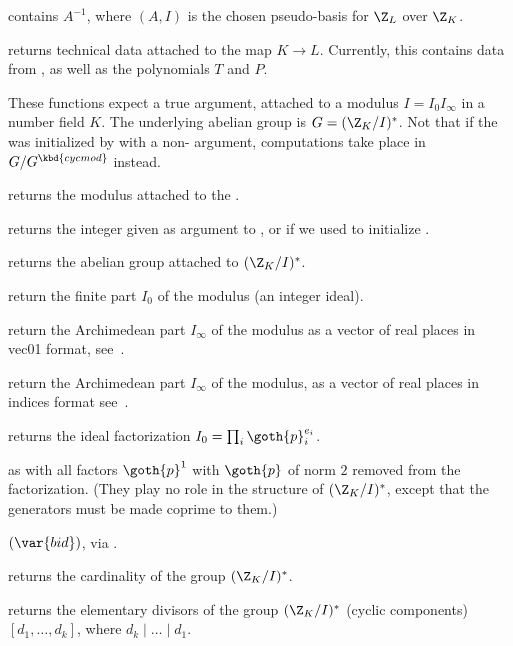  contains $A^{-1}$, where $(A,I)$
is the chosen pseudo-basis for $\Z_L$ over $\Z_K$.

 returns technical data attached to the map
$K\to L$. Currently, this contains data from ,
as well as the polynomials $T$ and $P$.


These functions expect a true  argument, attached to a modulus $I
= I_0 I_\infty$ in a number field $K$. The underlying abelian group is
$G = (\Z_K/I)^*$. Not that if the  was initialized by 
with a non-  argument, computations take place in
$G / G^\kbd{cycmod}$ instead.

 returns the modulus attached to the .

 returns the integer 
given as argument to , or  if we used 
to initialize .

 returns the abelian group attached
to $(\Z_K/I)^*$.

 return the finite part $I_0$
of the  modulus (an integer ideal).

 return the Archimedean part $I_\infty$
of the  modulus as a vector of real places in vec01 format,
see~.

 return the Archimedean part $I_\infty$
of the  modulus, as a vector of real places in indices format
see~.

 returns the ideal factorization
$I_0 = \prod_i \goth{p}_i^{e_i}$.

 as  with all factors
$\goth{p}^1$ with $\goth{p}$ of norm $2$ removed from the factorization.
(They play no role in the structure of $(\Z_K/I)^*$, except that the
generators must be made coprime to them.)

$(\var{bid})$, via .

 returns the cardinality of the
group $(\Z_K/I)^*$.

 returns the elementary divisors
of the group $(\Z_K/I)^*$ (cyclic components) $[d_1,\ldots, d_k]$, where $d_k
\mid \ldots \mid d_1$.

